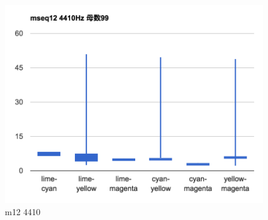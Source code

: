 \begin{figure}[p]
  \centering
  \includegraphics[clip,width=1.05\hsize]{img/m12_4410.png}
  \caption{m12 4410}\label{fig:m12Z4410}
\end{figure}




\clearpage





